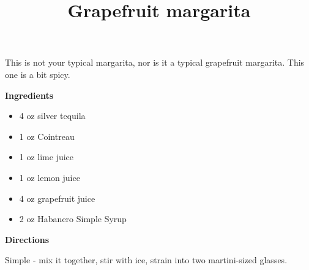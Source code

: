\documentclass{article}
\title{Grapefruit margarita}
\begin{document}
This is not your typical margarita, nor is it a typical grapefruit margarita. This one is a bit spicy.

\bigskip

\bigskip

\textbf{Ingredients}

\begin{itemize}
      \item 4 oz silver tequila
      \item 1 oz Cointreau
      \item 1 oz lime juice
      \item 1 oz lemon juice
      \item 4 oz grapefruit juice
      \item 2 oz Habanero Simple Syrup
\end{itemize}

\bigskip

\textbf{Directions}

Simple - mix it together, stir with ice, strain into two martini-sized glasses.

\end{document}
